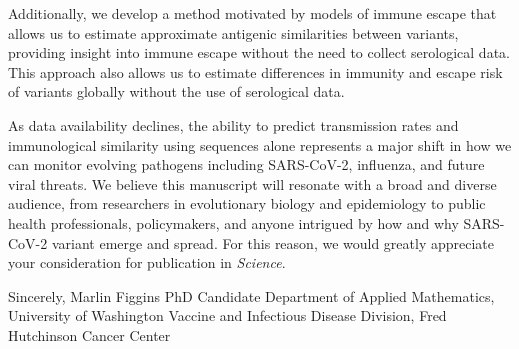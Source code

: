 \documentclass[11pt]{article}
\begin{document}
Additionally, we develop a method motivated by models of immune escape that allows us to estimate approximate antigenic similarities between variants, providing insight into immune escape without the need to collect serological data.
This approach also allows us to estimate differences in immunity and escape risk of variants globally without the use of serological data.

As data availability declines, the ability to predict transmission rates and immunological similarity using sequences alone represents a major shift in how we can monitor evolving pathogens including SARS-CoV-2, influenza, and future viral threats.
We believe this manuscript will resonate with a broad and diverse audience, from researchers in evolutionary biology and epidemiology to public health professionals, policymakers, and anyone intrigued by how and why SARS-CoV-2 variant emerge and spread.
For this reason, we would greatly appreciate your consideration for publication in \textit{Science}.

\vspace{0.3in} %

Sincerely, \newline
\vspace{0.05in} \newline
Marlin Figgins \newline
PhD Candidate \newline
Department of Applied Mathematics, University of Washington \newline
Vaccine and Infectious Disease Division, Fred Hutchinson Cancer Center
\end{document}

